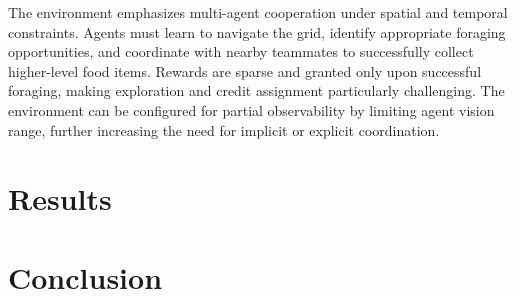 \documentclass{article}
\begin{document}
The environment emphasizes multi-agent cooperation under spatial and temporal constraints. 
Agents must learn to navigate the grid, identify appropriate foraging opportunities, 
and coordinate with nearby teammates to successfully collect higher-level food items. 
Rewards are sparse and granted only upon successful foraging, 
making exploration and credit assignment particularly challenging. 
The environment can be configured for partial observability by limiting agent vision range, 
further increasing the need for implicit or explicit coordination.

\section{Results}

\section{Conclusion}

\printbibliography
\end{document}
